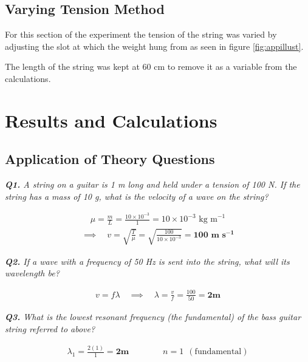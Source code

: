 \documentclass[12pt]{article}
\begin{document}
\subsection{Varying Tension Method}

For this section of the experiment the tension of the string was varied by adjusting the slot at which the weight hung from as seen in figure \ref{fig:appillust}.

The length of the string was kept at 60 cm to remove it as a variable from the calculations.

\section{Results and Calculations} \label{sec:3}

\subsection{Application of Theory Questions}

\textit{\textbf{Q1.} A string on a guitar is 1 m long and held under a tension of 100 N. If the string has a mass of 10 g, what is the velocity of a wave on the string?}

\vspace{-1.5ex}
\begin{gather*}
    \mu = \frac{m}{L} = \frac{10 \times 10^{-3}}{1} = 10 \times 10^{-3} \text{ kg m}^{-1}
\end{gather*}
\begin{gather*}
    \implies \quad v = \sqrt{\frac{T}{\mu}} = \sqrt{\frac{100}{10 \times 10^{-3}}} = \mathbf{100 \textbf{ m s}^{-1}}
\end{gather*}

\textit{\textbf{Q2.} If a wave with a frequency of 50 Hz is sent into the string, what will its wavelength be?}

\vspace{-1.5ex}
\begin{gather*}
    v = f \lambda \quad \implies \quad \lambda = \frac{v}{f} = \frac{100}{50} = \mathbf{2} \textbf{m}
\end{gather*}

\textit{\textbf{Q3.} What is the lowest resonant frequency (the fundamental) of the bass guitar string referred to above?}

\vspace{-1.5ex}
\begin{gather*}
    \lambda_{1} = \frac{2(1)}{1} = \mathbf{2} \textbf{m} \qquad\qquad n = 1 \:\: (\text{fundamental}) 
\end{gather*}
\end{document}
